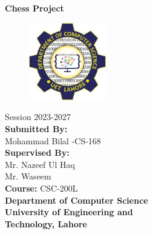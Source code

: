 \documentclass[a4paper,12pt]{article}
\begin{document}
\thispagestyle{empty} 

\vspace*{1cm} 

\begin{center}
    {\Huge\textbf {Chess Project}}  
    \vspace{1cm}  

    \begin{figure}[h!]
        \centering
        \includegraphics[width=0.3\textwidth]{Images/logo.jpg}
    \end{figure}
    
    {\large Session 2023-2027}\\[0.2cm]
    \vspace{0.7cm}
    {\Large\textbf {Submitted By: }}\\[0.6cm]
    {\large {Mohammad Bilal \space\space{}-CS-168}}\\[0.6cm]
    {\Large\textbf {Supervised By: }}\\[0.6cm]
    {\large {Mr. Nazeef Ul Haq }}\\[0.4cm]
    {\large {Mr. Waseem }}\\[0.6cm]
    {\Large\textbf {Course: } CSC-200L}\\[1.2cm]
    {\LARGE \textbf{ Department of Computer Science}}\\[0.7cm]
    {\Huge \textbf{University of Engineering and}}\\[0.5cm]
    {\Huge \textbf{Technology, Lahore}}\\[0.5cm]
    \vfill
\end{center}

\thispagestyle{empty} 


\renewcommand{\contentsname}{Table of Contents}

\tableofcontents

\newpage

\pagestyle{fancy}
\fancyhf{}
\fancyfoot[R]{{\thepage}}
\end{document}

